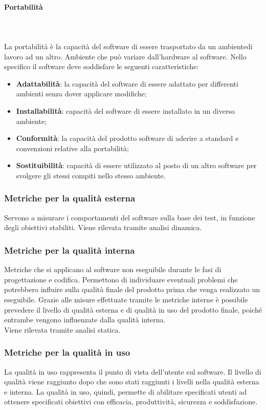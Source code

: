 \paragraph{Portabilità}\mbox{} \\ \mbox{} \\
La portabilità è la capacità del software di essere trasportato da un ambiente\glo di lavoro ad un altro. Ambiente che può variare dall'hardware al software.
Nello specifico il software deve soddisfare le seguenti caratteristiche:
\begin{itemize}
	\item \textbf{Adattabilità}: la capacità del software di essere adattato per differenti ambienti senza dover applicare modifiche;
	\item \textbf{Installabilità}: capacità del software di essere installato in un diverso ambiente;
	\item \textbf{Conformità}: la capacità del prodotto software di aderire a standard e convenzioni relative alla portabilità;
	\item \textbf{Sostituibilità}: capacità di essere utilizzato al posto di un altro software per svolgere gli stessi compiti nello stesso ambiente.
\end{itemize}
\subsubsection{Metriche per la qualità esterna}
Servono a misurare i comportamenti del software sulla base dei test, in funzione degli obiettivi stabiliti. Viene rilevata tramite analisi dinamica\glo.

\subsubsection{Metriche per la qualità interna}
Metriche che si applicano al software non eseguibile durante le fasi di progettazione e codifica. Permettono di individuare eventuali problemi che potrebbero influire sulla qualità finale del prodotto prima che venga realizzato un eseguibile. Grazie alle misure effettuate tramite le metriche interne è possibile prevedere il livello di qualità esterna e di qualità in uso del prodotto finale, poiché entrambe vengono influenzate dalla qualità interna.\\
Viene rilevata tramite analisi statica\glo.

\subsubsection{Metriche per la qualità in uso}
La qualità in uso rappresenta il punto di vista dell'utente sul software. Il livello di qualità viene raggiunto dopo che sono stati raggiunti i livelli nella qualità esterna e interna. La qualità in uso, quindi, permette di abilitare specificati utenti ad ottenere specificati obiettivi con efficacia\glo, produttività, sicurezza e soddisfazione.



